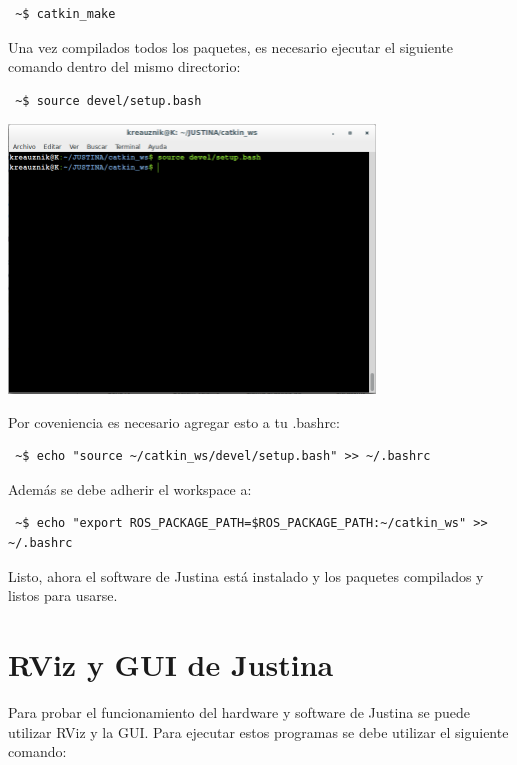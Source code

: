 \documentclass[user_manual.tex]{subfiles}
\begin{document}
\begin{verbatim}
 ~$ catkin_make
\end{verbatim}

Una vez compilados todos los paquetes, es necesario ejecutar el siguiente comando dentro del mismo directorio:

\begin{verbatim}
 ~$ source devel/setup.bash
\end{verbatim}

 \begin{center}
\includegraphics[width=0.73\textwidth]{Figures/PP/pp5.png}
\end{center}

Por coveniencia es necesario agregar esto a tu .bashrc:\\

\begin{verbatim}
 ~$ echo "source ~/catkin_ws/devel/setup.bash" >> ~/.bashrc
\end{verbatim}

Además se debe adherir el workspace a:\\

\begin{verbatim}
 ~$ echo "export ROS_PACKAGE_PATH=$ROS_PACKAGE_PATH:~/catkin_ws" >> ~/.bashrc
\end{verbatim}

Listo, ahora el software de Justina está instalado y los paquetes compilados y listos para usarse.

\section{RViz y GUI de Justina}
Para probar el funcionamiento del hardware y software de Justina se puede utilizar RViz y la GUI. Para ejecutar estos programas se debe utilizar el siguiente comando:
\end{document}
